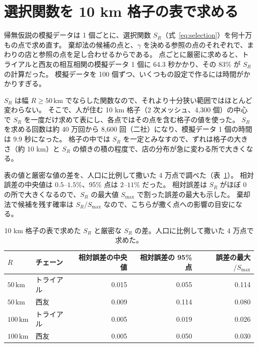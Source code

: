 \documentclass[a4paper,11pt]{ltjsarticle}
\begin{document}
\section{選択関数を 10 km 格子の表で求める}
\label{app:grid}

帰無仮説の模擬データは 1 個ごとに、選択関数 $S_R$（式~\eqref{eq:selection}）を何十万もの点で求め直す。
棄却法の候補の点と、$\gamma$ を決める参照の点のそれぞれで、まわりの店と参照の点を足し合わせるからである。
点ごとに厳密に求めると、トライアルと西友の相互相関の模擬データ 1 個に 64.3 秒かかり、その $83\%$ が $S_R$ の計算だった。
模擬データを 100 個ずつ、いくつもの設定で作るには時間がかかりすぎる。

$S_R$ は幅 $R \ge 50\,\mathrm{km}$ でならした関数なので、それより十分狭い範囲ではほとんど変わらない。
そこで、人が住む 10 km 格子（2 次メッシュ、4,300 個）の中心で $S_R$ を一度だけ求めて表にし、各点ではその点を含む格子の値を使った。
$S_R$ を求める回数は約 40 万回から 8,600 回（二社）になり、模擬データ 1 個の時間は 9.9 秒になった。
格子の中では $S_R$ を一定とみなすので、ずれは格子の大きさ（約 10 km）と $S_R$ の傾きの積の程度で、店の分布が急に変わる所で大きくなる。

表の値と厳密な値の差を、人口に比例して撒いた 4 万点で調べた（表~\ref{tab:grid-error}）。
相対誤差の中央値は $0.5$--$1.5\%$、95\% 点は $2$--$11\%$ だった。
相対誤差は $S_R$ がほぼ $0$ の所で大きくなるので、$S_R$ の最大値 $S_{\max}$ で割った誤差の最大も示した。
棄却法で候補を残す確率は $S_R / S_{\max}$ なので、こちらが撒く点への影響の目安になる。
\begin{table}[t]
  \centering
  \caption{10 km 格子の表で求めた $S_R$ と厳密な $S_R$ の差。人口に比例して撒いた 4 万点で求めた。}
  \label{tab:grid-error}
  \small
  \begin{tabular}{llrrr}
    \toprule
    $R$ & チェーン & 相対誤差の中央値 & 相対誤差の 95\% 点 & 誤差の最大 $/ S_{\max}$ \\
    \midrule
    $50\,\mathrm{km}$ & トライアル & 0.015 & 0.055 & 0.114 \\
    $50\,\mathrm{km}$ & 西友 & 0.009 & 0.114 & 0.080 \\
    $100\,\mathrm{km}$ & トライアル & 0.005 & 0.019 & 0.026 \\
    $100\,\mathrm{km}$ & 西友 & 0.005 & 0.050 & 0.030 \\
    \bottomrule
  \end{tabular}
\end{table}
\end{document}

